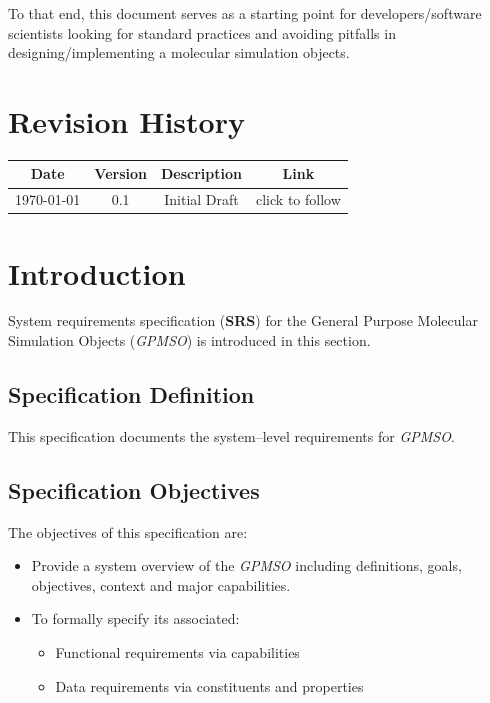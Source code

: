 \documentclass[12pt]{article}
\begin{document}
To that end, this document serves as a starting point for developers/software scientists looking for standard practices and avoiding pitfalls in designing/implementing a molecular simulation objects.

{\centering \section*{Revision History}}
\begin{table}[ht]
    \centering
    \begin{tabular}{|c|c|c|c|}
    \hline
    \textbf{Date} &  \textbf{Version} & \textbf{Description}  & \textbf{Link} \\
    \hline
    \today & 0.1 & Initial Draft & click to follow \\
    \hline
    \end{tabular}
\end{table}

\pagebreak
\tableofcontents
\thispagestyle{empty}
\pagebreak


\section{Introduction}
System requirements specification (\textbf{SRS}) for the General Purpose Molecular Simulation Objects (\textit{GPMSO}) is introduced in this section.

\subsection{Specification Definition}
This specification documents the system--level requirements for \textit{GPMSO}.

\subsection{Specification Objectives}
The objectives of this specification are:

\begin{itemize}
    \item Provide a system overview of the \textit{GPMSO} including definitions, goals, objectives, context and major capabilities.
    \item To formally specify its associated:
      \begin{itemize}
          \item Functional requirements via capabilities
          \item Data requirements via constituents and properties
      \end{itemize}
\end{itemize}
\end{document}
